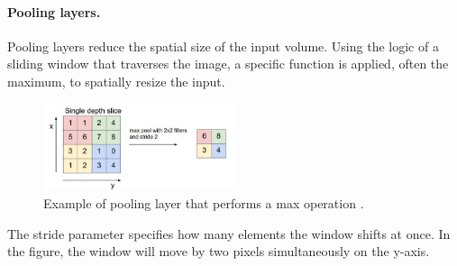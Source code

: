 \paragraph{Pooling layers.} Pooling layers reduce the spatial size of the input volume. Using the logic of a sliding window that traverses the image, a specific function is applied, often the maximum, to spatially resize the input.
\begin{figure}
    \centering
    \includegraphics[width=0.5\textwidth]{Images/pooling.png}
    \caption[Pooling layer.]{Example of pooling layer that performs a max operation \cite{giacomo_boracchi_convolutional_2021}.}
    \label{fig:poolingmax}
\end{figure}
The stride parameter specifies how many elements the window shifts at once. In the figure, the window will move by two pixels simultaneously on the y-axis.
